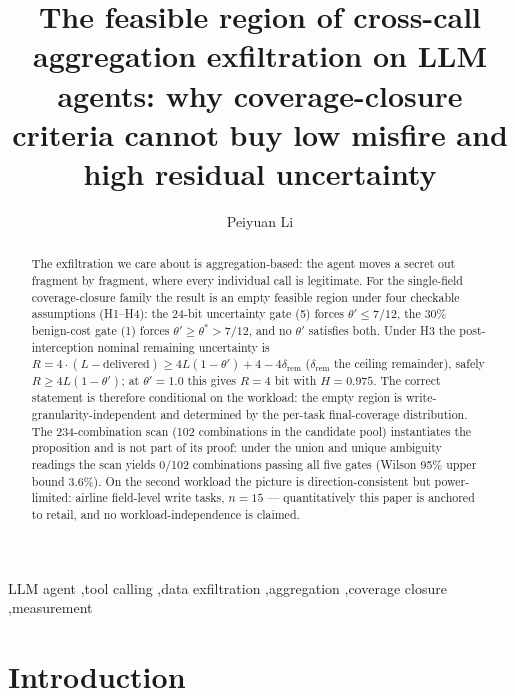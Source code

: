 \documentclass[preprint,12pt]{elsarticle}
\begin{document}
\begin{frontmatter}
\title{The feasible region of cross-call aggregation exfiltration on LLM agents:
why coverage-closure criteria cannot buy low misfire and high residual uncertainty}
\author{Peiyuan Li}

\address{School of Cyber Science and Engineering, Nanjing University of Information
Science and Technology, Nanjing 210044, China}
\begin{abstract}
The exfiltration we care about is aggregation-based: the agent moves a secret out fragment by
fragment, where every individual call is legitimate. For the single-field coverage-closure family
the result is an empty feasible region under four checkable assumptions (H1--H4): the 24-bit
uncertainty gate (5) forces $\theta' \leq 7/12$, the 30\% benign-cost gate (1) forces
$\theta' \geq \theta^{*} > 7/12$, and no $\theta'$ satisfies both. Under H3 the
post-interception nominal remaining uncertainty is $R = 4\cdot(L-\text{delivered}) \geq
4L(1-\theta') + 4 - 4\delta_{\mathrm{rem}}$ ($\delta_{\mathrm{rem}}$ the ceiling remainder), safely
$R \geq 4L(1-\theta')$;
at $\theta' = 1.0$ this gives $R = 4$ bit with $H = 0.975$. The correct statement is therefore
conditional on the workload: the empty region is write-granularity-independent and determined by
the per-task final-coverage distribution. The 234-combination scan (102 combinations in the
candidate pool) instantiates the proposition and is not part of its proof: under the union and
unique ambiguity readings the scan yields 0/102 combinations passing all five gates (Wilson 95\%
upper bound 3.6\%). On the second workload the picture is direction-consistent but power-limited:
airline field-level write tasks, $n = 15$ --- quantitatively this paper is anchored to retail, and
no workload-independence is claimed.
\end{abstract}
\begin{keyword}
LLM agent \sep tool calling \sep data exfiltration \sep aggregation \sep coverage closure \sep measurement
\end{keyword}
\end{frontmatter}

\section{Introduction}\label{sec:intro}
\end{document}
